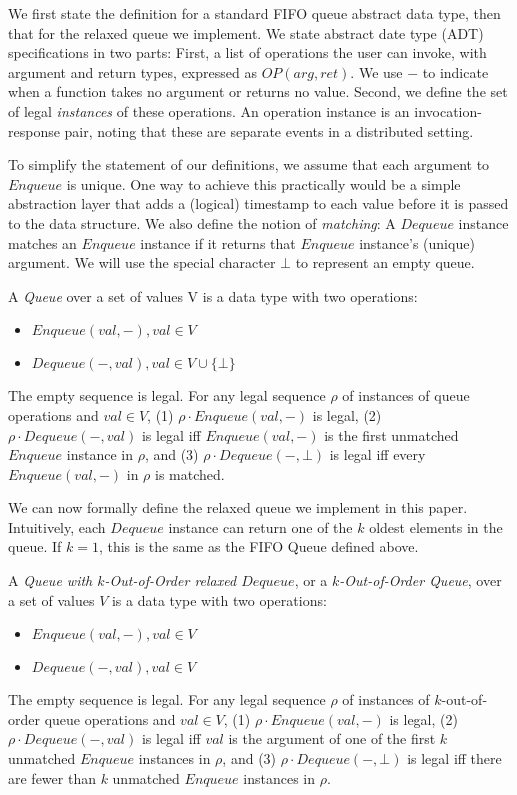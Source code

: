 \documentclass[a4paper,anonymous,USenglish]{lipics-v2021}
\theoremstyle{definition}
\begin{document}
We first state the definition for a standard FIFO queue abstract data type, then that for the relaxed queue we implement.  We state abstract date type (ADT) specifications in two parts: First, a list of operations the user can invoke, with argument and return types, expressed as $OP(arg,ret)$.  We use $-$ to indicate when a function takes no argument or returns no value.  Second, we define the set of legal \emph{instances} of these operations.  An operation instance is an invocation-response pair, noting that these are separate events in a distributed setting.

To simplify the statement of our definitions, we assume that each argument to $Enqueue$ is unique.  One way to achieve this practically would be a simple abstraction layer that adds a (logical) timestamp to each value before it is passed to the data structure.  We also define the notion of \emph{matching}: A $Dequeue$ instance matches an $Enqueue$ instance if it returns that $Enqueue$ instance's (unique) argument.  We will use the special character $\bot$ to represent an empty queue.

\begin{definition}\label{def:FIFOQueue}
  A \emph{Queue} over a set of values V is a data type with two operations:
  \begin{itemize}
  \item $Enqueue(val,-), val \in V$ 
  \item $Dequeue(-, val), val \in V \cup \{\bot\}$ 
  \end{itemize}
  
  The empty sequence is legal.  For any legal sequence $\rho$ of instances of queue operations and $val \in V$, (1) $\rho \cdot Enqueue(val,-)$ is legal, (2) $\rho \cdot Dequeue(-,val)$ is legal iff $Enqueue(val, -)$ is the first unmatched $Enqueue$ instance in $\rho$, and (3) $\rho \cdot Dequeue(-, \bot)$ is legal iff every $Enqueue(val, -)$ in $\rho$ is matched.
\end{definition}

We can now formally define the relaxed queue we implement in this paper.  Intuitively, each $Dequeue$ instance can return one of the $k$ oldest elements in the queue.  If $k=1$, this is the same as the FIFO Queue defined above.

\begin{definition} A \emph{Queue with $k$-Out-of-Order relaxed $Dequeue$}, or a \emph{$k$-Out-of-Order Queue}, over a set of values $V$ is a data type with two operations:
  \begin{itemize}
  \item $Enqueue(val,-), val \in V$
  \item $Dequeue(-,val), val \in V$
  \end{itemize}

  The empty sequence is legal.  For any legal sequence $\rho$ of instances of $k$-out-of-order queue operations and $val \in V$, (1) $\rho \cdot Enqueue(val,-)$ is legal, (2) $\rho \cdot Dequeue(-,val)$ is legal iff $val$ is the argument of one of the first $k$ unmatched $Enqueue$ instances in $\rho$, and (3) $\rho \cdot Dequeue(-,\bot)$ is legal iff there are fewer than $k$ unmatched $Enqueue$ instances in $\rho$.
\end{definition}
\end{document}
